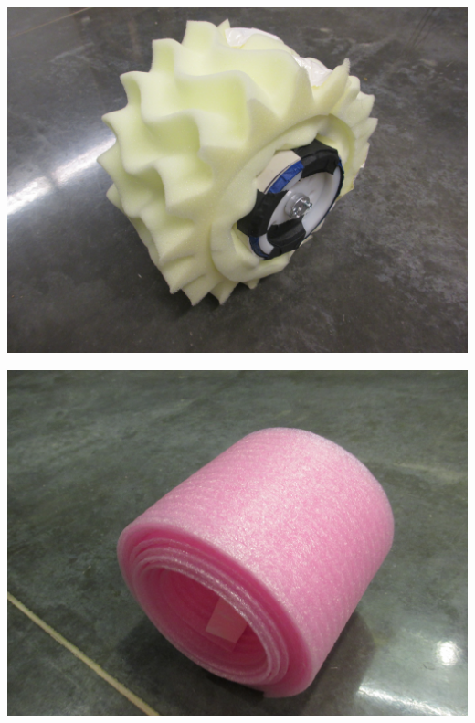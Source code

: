 \begin{center}
 \includegraphics[width=\textwidth]{./Entries/Images/launchProto2.JPG}
\end{center}

\begin{center}
 \includegraphics[width=\textwidth]{./Entries/Images/launchProto12.JPG}
\end{center}